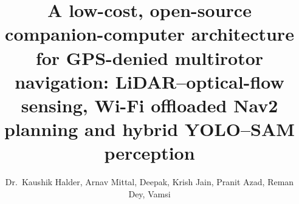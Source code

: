 \documentclass[10pt,a4paper]{article}
\title{A low-cost, open-source companion-computer architecture for GPS-denied
multirotor navigation: LiDAR--optical-flow sensing, Wi-Fi offloaded Nav2 planning
and hybrid YOLO--SAM perception}
\author{Dr.~Kaushik Halder\aff{b,$\dagger$}, Arnav Mittal\aff{d}, Deepak\aff{a}, Krish Jain\aff{b}, Pranit Azad\aff{b},
  Reman Dey\aff{c}, Vamsi\aff{a}}
\begin{document}
\hxmaketitle















\appendix

\end{document}
